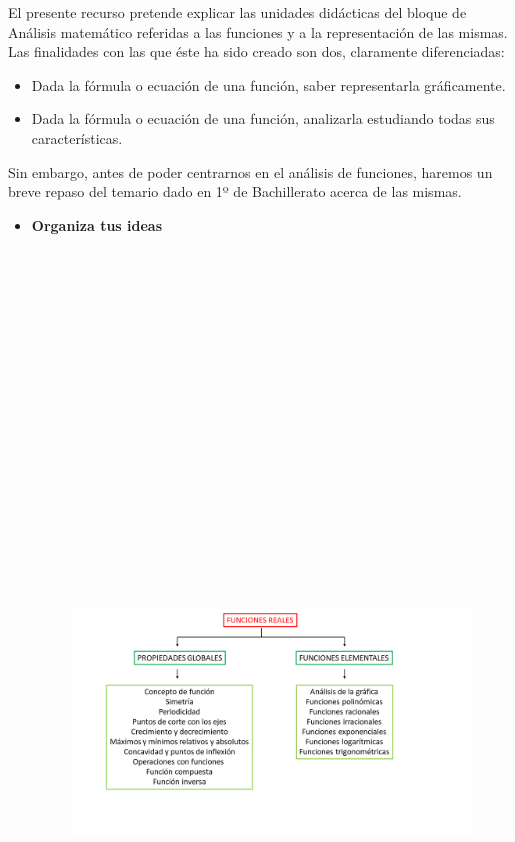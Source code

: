 

El presente recurso pretende explicar las unidades didácticas del bloque de Análisis matemático referidas a las funciones y a la representación de las mismas. Las finalidades con las que éste ha sido creado son dos, claramente diferenciadas:
\begin{itemize}
	\item Dada la fórmula o ecuación de una función, saber representarla gráficamente.
	\item Dada la fórmula o ecuación de una función, analizarla estudiando todas sus características.
\end{itemize}
Sin embargo, antes de poder centrarnos en el análisis de funciones, haremos un breve repaso del temario dado en 1º de Bachillerato acerca de las mismas.\\

\begin{itemize}
	\item \textbf{Organiza tus ideas}
	\begin{figure}
		\includegraphics[width=30cm, height=25cm]{samples/ideas.png}
		\centering
	\end{figure}
\end{itemize}
